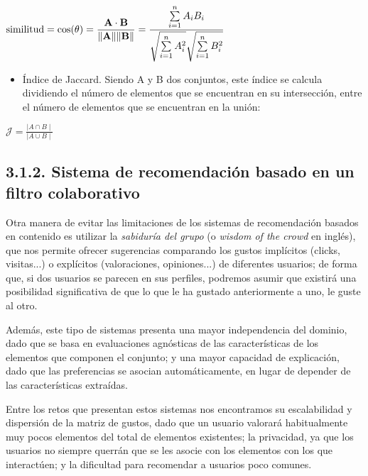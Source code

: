 ${\displaystyle {\text{similitud}}=\cos(\theta )={\mathbf {A} \cdot \mathbf {B} \over \|\mathbf {A} \|\|\mathbf {B} \|}={\frac {\sum \limits _{i=1}^{n}{A_{i}B_{i}}}{{\sqrt {\sum \limits _{i=1}^{n}{A_{i}^{2}}}}{\sqrt {\sum \limits _{i=1}^{n}{B_{i}^{2}}}}}}}$

\begin{itemize}
    \item Índice de Jaccard. Siendo A y B dos conjuntos, este índice se calcula dividiendo el número de elementos que se encuentran en su intersección, entre el número de elementos que se encuentran en la unión:
\end{itemize}

${\displaystyle {\mathcal {J}}={\frac {\mid A\cap B\mid }{\mid A\cup B\mid }}}$

\subsection{3.1.2. Sistema de recomendación basado en un filtro colaborativo}

Otra manera de evitar las limitaciones de los sistemas de recomendación basados en contenido es utilizar la \textit{sabiduría del grupo} (o \textit{wisdom of the crowd} en inglés), que nos permite ofrecer sugerencias comparando los gustos implícitos (clicks, visitas...) o explícitos (valoraciones, opiniones...) de diferentes usuarios; de forma que, si dos usuarios se parecen en sus perfiles, podremos asumir que existirá una posibilidad significativa de que lo que le ha gustado anteriormente a uno, le guste al otro.

Además, este tipo de sistemas presenta una mayor independencia del dominio, dado que se basa en evaluaciones agnósticas de las características de los elementos que componen el conjunto; y una mayor capacidad de explicación, dado que las preferencias se asocian automáticamente, en lugar de depender de las características extraídas.

Entre los retos que presentan estos sistemas nos encontramos su escalabilidad y dispersión de la matriz de gustos, dado que un usuario valorará habitualmente muy pocos elementos del total de elementos existentes; la privacidad, ya que los usuarios no siempre querrán que se les asocie con los elementos con los que interactúen; y la dificultad para recomendar a usuarios poco comunes.

